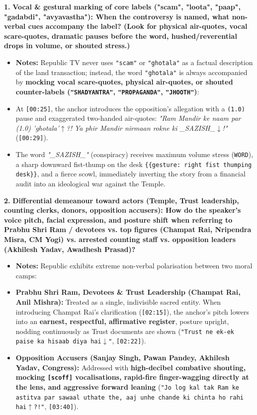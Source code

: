\documentclass[10pt,a4paper]{article}
\begin{document}
\noindent\textbf{1.} \textbf{Vocal \& gestural marking of core labels ("scam", "loota", "paap", "gadabdi", "avyavastha"): When the controversy is named, what non-verbal cues accompany the label? (Look for physical air-quotes, vocal scare-quotes, dramatic pauses before the word, hushed/reverential drops in volume, or shouted stress.)}\par\smallskip
\begin{itemize}
  \item \textbf{Notes:}
Republic TV never uses \texttt{"scam"} or \texttt{"ghotala"} as a factual description of the land transaction; instead, the word \texttt{"ghotala"} is always accompanied by \textbf{mocking vocal scare-quotes, physical air-quotes, or shouted counter-labels (\texttt{"SHADYANTRA"}, \texttt{"PROPAGANDA"}, \texttt{"JHOOTH"})}:\par\smallskip
  \item At \texttt{[00:25]}, the anchor introduces the opposition's allegation with a \texttt{(1.0)} pause and exaggerated two-handed air-quotes: \textit{"Ram Mandir ke naam par (1.0) 'ghotala'$\uparrow$?! Ya phir Mandir nirmaan rokne ki \_SAZISH\_$\downarrow$!"} (\texttt{[00:29]}).
  \item The word \textit{"\_SAZISH\_"} (conspiracy) receives maximum volume stress (\texttt{WORD}), a sharp downward fist-thump on the desk \texttt{\{\{gesture: right fist thumping desk\}\}}, and a fierce scowl, immediately inverting the story from a financial audit into an ideological war against the Temple.
\end{itemize}

\noindent\textbf{2.} \textbf{Differential demeanour toward actors (Temple, Trust leadership, counting clerks, donors, opposition accusers): How do the speaker's voice pitch, facial expression, and posture shift when referring to Prabhu Shri Ram / devotees vs. top figures (Champat Rai, Nripendra Misra, CM Yogi) vs. arrested counting staff vs. opposition leaders (Akhilesh Yadav, Awadhesh Prasad)?}\par\smallskip
\begin{itemize}
  \item \textbf{Notes:}
Republic exhibits extreme non-verbal polarisation between two moral camps:\par\smallskip
  \item \textbf{Prabhu Shri Ram, Devotees \& Trust Leadership (Champat Rai, Anil Mishra):} Treated as a single, indivisible sacred entity. When introducing Champat Rai's clarification (\texttt{[02:15]}), the anchor's pitch lowers into an \textbf{earnest, respectful, affirmative register}, posture upright, nodding continuously as Trust documents are shown (\texttt{"Trust ne ek-ek paise ka hisaab diya hai$\downarrow$"}, \texttt{[02:22]}).
  \item \textbf{Opposition Accusers (Sanjay Singh, Pawan Pandey, Akhilesh Yadav, Congress):} Addressed with \textbf{high-decibel combative shouting, mocking \texttt{[scoff]} vocalisations, rapid-fire finger-wagging directly at the lens, and aggressive forward leaning} (\texttt{"Jo log kal tak Ram ke astitva par sawaal uthate the, aaj unhe chande ki chinta ho rahi hai$\uparrow$?!"}, \texttt{[03:40]}).
\end{itemize}
\end{document}
